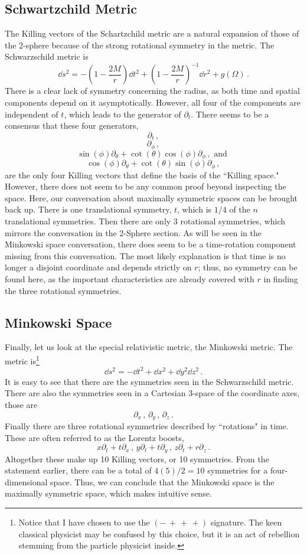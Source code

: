\documentclass[11pt]{article}
\begin{document}
\subsection{Schwartzchild Metric}
The Killing vectors of the Schartzchild metric are a natural expansion of those of the 2-sphere because of the strong rotational symmetry in the metric. The Schwarzschild metric is 
\[\dd{s}^2 = -\left(1 -\frac{2M}{r}\right)\dd{t}^2 + \left(1 - \frac{2M}{r}\right)^{-1}\dd{r}^2 + g(\Omega) \, .\]
There is a clear lack of symmetry concerning the radius, as both time and spatial components depend on it asymptotically. However, all four of the components are independent of $t$, which leads to the generator of $\partial_t$. There seems to be a consensus that these four generators, 
\[\partial_t \, ,\]
\[\partial_\phi \, ,\]
\[\sin(\phi)\partial_\theta + \cot(\theta)\cos(\phi)\partial_\phi \, , \text{ and }\]
\[\cos(\phi)\partial_\theta + \cot(\theta)\sin(\phi)\partial_\phi \, ,\]
are the only four Killing vectors that define the basis of the ``Killing space." However, there does not seem to be any common proof beyond inspecting the space. Here, our conversation about maximally symmetric spaces can be brought back up. There is one translational symmetry, $t$, which is $1/4$ of the $n$ translational symmetries. Then there are only $3$ rotational symmetries, which mirrors the conversation in the 2-Sphere section. As will be seen in the Minkowski space conversation, there does seem to be a time-rotation component missing from this conversation. The most likely explanation is that time is no longer a disjoint coordinate and depends strictly on $r$; thus, no symmetry can be found here, as the important characteristics are already covered with $r$ in finding the three rotational symmetries.


\subsection{Minkowski Space}
Finally, let us look at the special relativistic metric, the Minkowski metric. The metric is\footnote{Notice that I have chosen to use the $(-\, +\, +\, +)$ signature. The keen classical physicist may be confused by this choice, but it is an act of rebellion stemming from the particle physicist inside.}
\[\dd{s}^2 = -\dd{t}^2 + \dd{x}^2 + \dd{y}^2 \dd{z}^2 \, .\]
It is easy to see that there are the symmetries seen in the Schwarzschild metric. There are also the symmetries seen in a Cartesian 3-space of the coordinate axes, those are 
\[\partial_x \, , \, \partial_y \, , \, \partial_z \, .\]
Finally there are three rotational symmetries described by ``rotations" in time. These are often referred to as the Lorentz boosts,
\[x\partial_t + t\partial_x \, , \, y\partial_t + t \partial_y \, , \, z\partial_t + r \partial_z \, .\]
Altogether these make up 10 Killing vectors, or 10 symmetries. From the statement earlier, there can be a total of $4(5)/2 = 10$ symmetries for a four-dimensional space. Thus, we can conclude that the Minkowski space is the maximally symmetric space, which makes intuitive sense.
\end{document}
